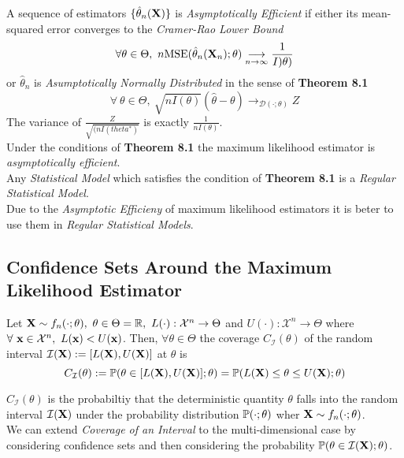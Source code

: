 \documentclass[11pt,a4paper]{article}
\begin{document}
A sequence of estimators $\{\hat{\theta}_n(\textbf{X})\}$ is \textit{Asymptotically Efficient} if either its mean-squared error converges to the \textit{Cramer-Rao Lower Bound}
$$\forall\theta\in\Theta,\ n\text{MSE}(\hat{\theta}_n(\X_n);\theta)\underset{n\to\infty}{\longrightarrow}\frac{1}{I)\theta)}$$
or $\hat{\theta}_n$ is \textit{Asumptotically Normally Distributed} in the sense of \textbf{Theorem 8.1}
$$\forall\ \theta\in\Theta,\ \sqrt{nI(\theta)}(\hat{\theta}-\theta)\to_{\mathcal{D}(\cdot;\theta)}Z$$
\nb The variance of $\frac{Z}{\sqrt{(nI(theta^*)}}$ is exactly $\frac{1}{nI(\theta)}$.\\

\theorem{}
Under the conditions of \textbf{Theorem 8.1} the maximum likelihood estimator is \textit{asymptotically efficient}.\\

Any \textit{Statistical Model} which satisfies the condition of \textbf{Theorem 8.1} is a \textit{Regular Statistical Model}.\\

Due to the \textit{Asymptotic Efficieny} of maximum likelihood estimators it is beter to use them in \textit{Regular Statistical Models}.\\

\subsection{Confidence Sets Around the Maximum Likelihood Estimator}

Let $\X\sim f_n(\cdot;\theta),\ \theta\in\Theta=\reals,\ L(\cdot):\mathcal{X}^n\to\Theta$ and $U(\cdot):\mathcal{X}^n\to\Theta$ where $\forall\ \x\in\mathcal{X}^n,\ L(\x)<U(\x)$. Then, $\forall\theta\in\Theta$ the coverage $C_\mathcal{I}(\theta)$ of the random interval $\mathcal{I}(\textbf{X}):=[L(\textbf{X}),U(\textbf{X})]$ at $\theta$ is
$$C_\mathcal{I}(\theta):=\mathbb{P}(\theta\in[L(\textbf{X}),U(\textbf{X})];\theta)=\mathbb{P}(L(\textbf{X})\leq\theta\leq U(\textbf{X});\theta)$$

$C_\mathcal{I}(\theta)$ is the probabiltiy that the deterministic quantity $\theta$ falls into the random interval $\mathcal{I}(\textbf{X})$ under the probability distribution $\mathbb{P}(\cdot;\theta)$ wher $\textbf{X}\sim f_n(\cdot;\theta)$.\\

We can extend \textit{Coverage of an Interval} to the multi-dimensional case by considering confidence sets and then considering the probability $\mathbb{P}(\theta\in\mathcal{I}(\textbf{X});\theta)$.\\
\end{document}

